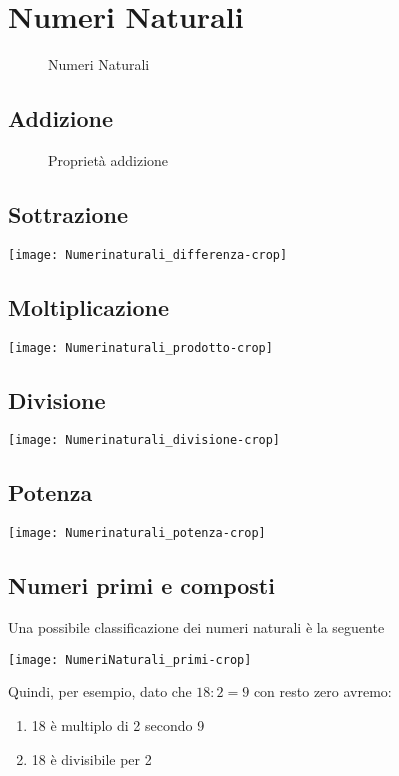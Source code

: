 \chapter{Numeri Naturali}
\label{cha:NumeriNaturali}
\minitoc
\mtcskip                                %
\minilof                                %
\mtcskip                                %
\minilot
\begin{figure} %
	\centering

	\caption{Numeri Naturali}
	\label{fig:NumeriNaturali}\end{figure}

\section{Addizione}
\label{sec:NumerinatADD}
\begin{figure} %
	\centering

	\caption{Proprietà addizione}
	\label{fig:ProprietaAddizione}\end{figure}
\section{Sottrazione}
\label{sec:NumerinatDiff}
\texttt{[image: Numerinaturali\_differenza-crop]}
\section{Moltiplicazione}
\label{sec:NumerinatMolt}
\texttt{[image: Numerinaturali\_prodotto-crop]}
\section{Divisione}
\label{sec:Numerinatdiv}
\texttt{[image: Numerinaturali\_divisione-crop]}
\section{Potenza}
\label{sec:NumerinatPot}
\texttt{[image: Numerinaturali\_potenza-crop]}
\section{Numeri primi e composti}
\label{sec:Numeriprimiecomposti}
Una possibile classificazione dei numeri naturali è la seguente
\begin{center}
	\texttt{[image: NumeriNaturali\_primi-crop]}
\end{center}
Quindi, per esempio, dato che $18:2=9$ con resto zero avremo:
\begin{enumerate}
	\item 18 è multiplo di 2 secondo 9
	\item 18 è divisibile per 2
\end{enumerate}
